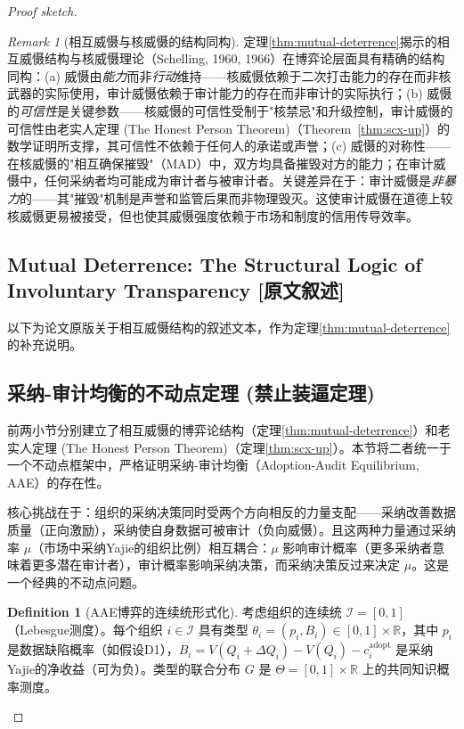 \documentclass[12pt,a4paper]{ctexart}
\theoremstyle{definition}
\newtheorem{definition}{Definition}[section]
\theoremstyle{remark}
\newtheorem{remark}{Remark}[section]
\begin{document}
\begin{proof}[Proof sketch]
\begin{remark}[相互威慑与核威慑的结构同构]
定理\ref{thm:mutual-deterrence}揭示的相互威慑结构与核威慑理论（Schelling, 1960, 1966）在博弈论层面具有精确的结构同构：(a) 威慑由\textit{能力}而非\textit{行动}维持——核威慑依赖于二次打击能力的存在而非核武器的实际使用，审计威慑依赖于审计能力的存在而非审计的实际执行；(b) 威慑的\textit{可信性}是关键参数——核威慑的可信性受制于"核禁忌"和升级控制，审计威慑的可信性由老实人定理 (The Honest Person Theorem)（Theorem~\ref{thm:scx-up}）的数学证明所支撑，其可信性不依赖于任何人的承诺或声誉；(c) 威慑的对称性——在核威慑的"相互确保摧毁"（MAD）中，双方均具备摧毁对方的能力；在审计威慑中，任何采纳者均可能成为审计者与被审计者。关键差异在于：审计威慑是\textit{非暴力}的——其"摧毁"机制是声誉和监管后果而非物理毁灭。这使审计威慑在道德上较核威慑更易被接受，但也使其威慑强度依赖于市场和制度的信用传导效率。
\end{remark}

\subsection{Mutual Deterrence: The Structural Logic of Involuntary Transparency [原文叙述]}

以下为论文原版关于相互威慑结构的叙述文本，作为定理\ref{thm:mutual-deterrence}的补充说明。

\subsection{采纳-审计均衡的不动点定理 (禁止装逼定理)}

前两小节分别建立了相互威慑的博弈论结构（定理\ref{thm:mutual-deterrence}）和老实人定理 (The Honest Person Theorem)（定理\ref{thm:scx-up}）。本节将二者统一于一个不动点框架中，严格证明采纳-审计均衡（Adoption-Audit Equilibrium, AAE）的存在性。

核心挑战在于：组织的采纳决策同时受两个方向相反的力量支配——采纳改善数据质量（正向激励），采纳使自身数据可被审计（负向威慑）。且这两种力量通过采纳率 $\mu$（市场中采纳Yajie的组织比例）相互耦合：$\mu$ 影响审计概率（更多采纳者意味着更多潜在审计者），审计概率影响采纳决策，而采纳决策反过来决定 $\mu$。这是一个经典的不动点问题。

\begin{definition}[AAE博弈的连续统形式化]
\label{def:aae-continuum}
考虑组织的连续统 $\mathcal{I} = [0,1]$（Lebesgue测度）。每个组织 $i \in \mathcal{I}$ 具有类型 $\theta_i = (p_i, B_i) \in [0,1] \times \mathbb{R}$，其中 $p_i$ 是数据缺陷概率（如假设D1），$B_i = V(Q_i + \Delta Q_i) - V(Q_i) - c_i^{\text{adopt}}$ 是采纳Yajie的净收益（可为负）。类型的联合分布 $G$ 是 $\Theta = [0,1] \times \mathbb{R}$ 上的共同知识概率测度。


\end{definition}
\end{proof}
\end{document}
